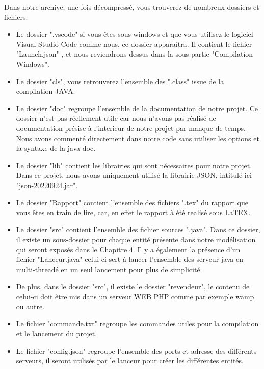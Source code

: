 Dans notre archive, une fois décompressé, vous trouverez de nombreux dossiers et fichiers.
\begin{itemize}
    \item Le dossier ".vscode" si vous êtes sous windows et que vous utilisez le logiciel Visual Studio Code comme nous, ce dossier apparaîtra. Il contient le fichier "Launch.json" , et nous reviendrons dessus dans la sous-partie "Compilation Windows".
    \item   Le dossier "cls", vous retrouverez l'ensemble des ".class" issue de la compilation JAVA.
    \item   Le dossier "doc" regroupe l'ensemble de la documentation de notre projet. Ce dossier n'est pas réellement utile car nous n'avons pas réalisé de documentation présise à l'interieur de notre projet par manque de temps. Nous avons commenté directement dans notre code sans utiliser les options et la syntaxe de la java doc.
    \item   Le dossier "lib" contient les librairies qui sont nécessaires pour notre projet. Dans ce projet, nous avons uniquement utilisé la librairie JSON, intitulé ici "json-20220924.jar".
    \item Le dossier "Rapport" contient l'ensemble des fichiers ".tex" du rapport que vous êtes en train de lire, car, en effet le rapport à été realisé sous LaTEX.
    \item Le dossier "src" contient l'ensemble des fichier sources ".java". Dans ce dossier, il existe un sous-dossier pour chaque entité présente dans notre modélisation qui seront exposés dans le Chapitre 4. Il y a également la présence d'un fichier "Lanceur.java" celui-ci sert à lancer l'ensemble des serveur java en multi-threadé en un seul lancement pour plus de simplicité. 
    \item De plus, dans le dossier "src", il existe le dossier "revendeur", le contenu de celui-ci doit être mis dans un serveur WEB PHP comme par exemple wamp ou autre.
    \item Le fichier "commande.txt" regroupe les commandes utiles pour la compilation et le lancement du projet.
     \item Le fichier "config.json" regroupe l'ensemble des ports et adresse des différents serveurs, il seront utilisés par le lanceur pour créer les différentes entités.

\end{itemize}

\newpage